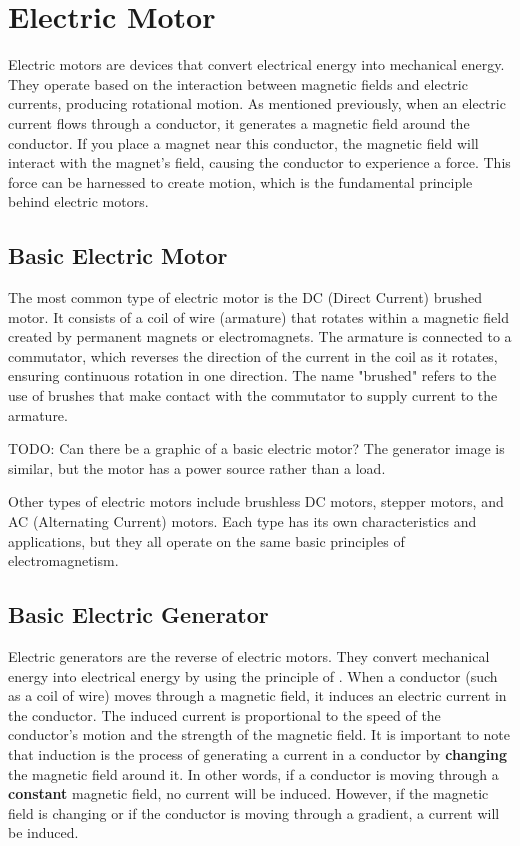 \chapter{Electric Motor}

Electric motors are devices that convert electrical energy into mechanical energy. They operate
based on the interaction between magnetic fields and electric currents, producing rotational
motion. As mentioned previously, when an electric current flows through a conductor, it generates
a magnetic field around the conductor. If you place a magnet near this conductor, the
magnetic field will interact with the magnet's field, causing the conductor to experience a force.
This force can be harnessed to create motion, which is the fundamental principle behind electric motors.

\section{Basic Electric Motor}

The most common type of electric motor is the DC (Direct Current) brushed motor. It consists of a coil of wire
(armature) that rotates within a magnetic field created by permanent magnets or electromagnets. The armature 
is connected to a commutator, which reverses the direction of the current in the coil as it rotates, ensuring 
continuous rotation in one direction. The name "brushed" refers to the use of brushes that make contact with 
the commutator to supply current to the armature. 

TODO: Can there be a graphic of a basic electric motor? The generator image is similar, but the motor has a power source rather than a load.

Other types of electric motors include brushless DC motors, stepper motors, and AC (Alternating Current) motors. Each type has its own
characteristics and applications, but they all operate on the same basic principles of electromagnetism.

\section{Basic Electric Generator}

Electric generators are the reverse of electric motors. They convert mechanical energy into electrical energy by
using the principle of . When a conductor (such as a coil of wire) moves through a magnetic field, 
it induces an electric current in the conductor. The induced current is proportional to the speed of the conductor's motion and the 
strength of the magnetic field. It is important to note that induction is the process of generating a current in a conductor by \textbf{changing}
the magnetic field around it. In other words, if a conductor is moving through a \textbf{constant} magnetic field, no current
will be induced. However, if the magnetic field is changing or if the conductor is moving through a gradient, a current will be induced.


